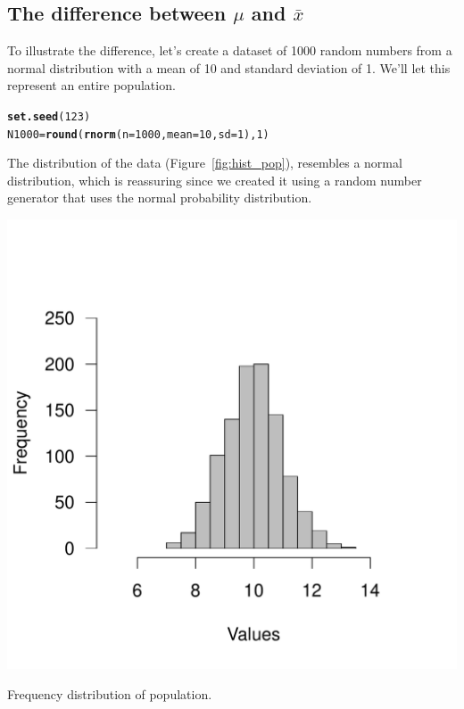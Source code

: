 \documentclass{tufte-handout}\usepackage[]{graphicx}\usepackage[]{color}
\makeatletter
\def\maxwidth{ %
  \ifdim\Gin@nat@width>\linewidth
    \linewidth
  \else
    \Gin@nat@width
  \fi
}
\newcommand{\hlnum}[1]{\textcolor[rgb]{0.686,0.059,0.569}{#1}}%
\newcommand{\hlstd}[1]{\textcolor[rgb]{0.345,0.345,0.345}{#1}}%
\newcommand{\hlkwb}[1]{\textcolor[rgb]{0.69,0.353,0.396}{#1}}%
\newcommand{\hlkwc}[1]{\textcolor[rgb]{0.333,0.667,0.333}{#1}}%
\newcommand{\hlkwd}[1]{\textcolor[rgb]{0.737,0.353,0.396}{\textbf{#1}}}%
\newenvironment{kframe}{%
 \def\at@end@of@kframe{}%
 \ifinner\ifhmode%
  \def\at@end@of@kframe{\end{minipage}}%
  \begin{minipage}{\columnwidth}%
 \fi\fi%
 \def\FrameCommand##1{\hskip\@totalleftmargin \hskip-\fboxsep
 \colorbox{shadecolor}{##1}\hskip-\fboxsep
     \hskip-\linewidth \hskip-\@totalleftmargin \hskip\columnwidth}%
 \MakeFramed {\advance\hsize-\width
   \@totalleftmargin\z@ \linewidth\hsize
   \@setminipage}}%
 {\par\unskip\endMakeFramed%
 \at@end@of@kframe}
\newenvironment{knitrout}{}{} %
\makeatother
\begin{document}
\subsection{The difference between $\mu$ and $\bar{x}$}

To illustrate the difference, let's create a dataset of 1000 random numbers from a normal distribution with a mean of 10 and standard deviation of 1. We'll let this represent an entire population. 
\begin{knitrout}
\color{fgcolor}\begin{kframe}
\begin{alltt}
\hlkwd{set.seed}\hlstd{(}\hlnum{123}\hlstd{)}
\hlstd{N1000} \hlkwb{=} \hlkwd{round}\hlstd{(}\hlkwd{rnorm}\hlstd{(}\hlkwc{n}\hlstd{=} \hlnum{1000}\hlstd{,} \hlkwc{mean} \hlstd{=} \hlnum{10}\hlstd{,} \hlkwc{sd} \hlstd{=} \hlnum{1}\hlstd{),} \hlnum{1}\hlstd{)}
\end{alltt}
\end{kframe}
\end{knitrout}

The distribution of the data (Figure~\ref{fig:hist_pop}), resembles a normal distribution, which is reassuring since we created it using a random number generator that uses the normal probability distribution. 

\begin{marginfigure}
\begin{knitrout}
\color{fgcolor}
\includegraphics[width=\maxwidth]{figure/unnamed-chunk-3-1} 

\end{knitrout}
\caption{Frequency distribution of population.}
\label{fig:hist_pop}
\end{marginfigure}
\end{document}
